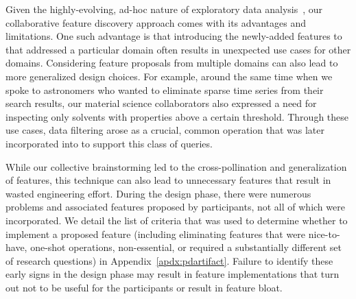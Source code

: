 {  \par Given the highly-evolving, ad-hoc nature of exploratory data analysis~\cite{Keim2006,Tukey1970}, our collaborative feature discovery approach  comes with its advantages and limitations. One such advantage is that introducing the newly-added features to \zvpp that addressed a particular domain often results in unexpected use cases for other domains. Considering feature proposals from multiple domains can also lead to more generalized design choices. For example, around the same time when we spoke to astronomers who wanted to eliminate sparse time series from their search results, our material science collaborators also expressed a need for inspecting only solvents with properties above a certain threshold. Through these use cases, data filtering arose as a crucial, common operation that was later incorporated into \zvpp to support this class of queries. %
  \par While our collective brainstorming led to the cross-pollination and generalization of features, this technique can also lead to unnecessary features that result in wasted engineering effort. During the design phase, there were numerous problems and associated features proposed by participants, not all of which were incorporated. We detail the list of criteria that was used to determine whether to implement a proposed feature (including eliminating features that were nice-to-have, one-shot operations, non-essential, or required a substantially different set of research questions) in Appendix~\ref{apdx:pdartifact}. Failure to identify these early signs in the design phase may result in feature implementations that turn out not to be useful for the participants or result in feature bloat.
}
